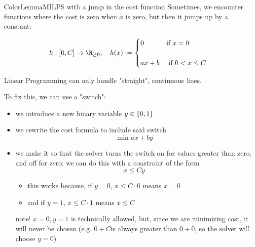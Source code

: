\documentclass[a4paper, 11pt]{report}
\begin{document}
\begin{cframe}{ColorLemma}{MILPS with a jump in the cost function}
Sometimes, we encounter functions where the cost is zero when $x$ is zero, but then it jumps up by a constant:

$$ h:[0, C] \to \R_{\geq 0}, \quad h(x) := \begin{cases}
    0 & \text{if } x = 0 \\\\
    ax + b & \text{ if } 0 < x \leq  C
\end{cases} 
$$

Linear Programming can only handle "straight", continuous lines.

To fix this, we can use a "switch":
\begin{itemize}
    \item we introduce a new binary variable $y \in \set{0,1}$
    \item we rewrite the cost formula to include said switch
        $$ \min ax+by $$
    \item we make it so that the solver turns the switch on for values greater than zero, and off for zero; we can do this with a constraint of the form
        $$ x \leq C y $$
        \begin{itemize}
            \item this works because, if $y=0$, $x\leq C \cdot 0$ means $x=0$
            \item and if $y=1$, $x\leq C \cdot 1$ means $x \leq  C$
        \end{itemize}
        \subitem \color{gray} note! $x = 0, y = 1$ is technically allowed, but, since we are minimizing cost, it will never be chosen (e.g. $0 + C$is always greater than $0 + 0$, so the solver will choose $y=0$)
\end{itemize}

\end{cframe}
\end{document}
